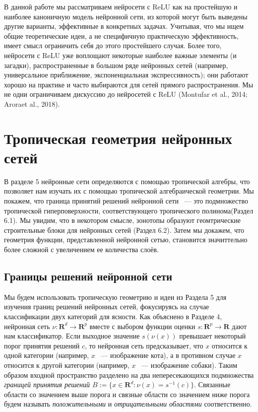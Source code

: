 \documentclass[russian]{lecture-notes}
\begin{document}
	В данной работе мы  рассматриваем нейросети с ReLU как на простейшую и наиболее каноничную модель нейронной сети,  из которой могут быть выведены другие варианты, эффективные в конкретных задачах. Учитывая, что мы ищем общие теоретические идеи, а не специфичную практическую эффективность, имеет смысл ограничить себя до этого простейшего случая. Более того, нейросети с ReLU уже воплощают некоторые наиболее важные элементы (и загадки), распространенные в большом ряде нейронных сетей (например, универсальное приближение, экспоненциальная экспрессивность); они работают хорошо на практике и часто выбираются для сетей прямого распространения. Мы не одни ограничиваем дискуссию до нейросетей с ReLU  (Montufar et al., 2014; Aroraet al., 2018).

	\section{Тропическая геометрия нейронных сетей}
	
	В разделе 5 нейронные сети определяются с помощью тропической алгебры, что позволяет нам изучать их с помощью тропической алгебраической геометрии. Мы покажем, что граница принятий решений нейронной сети ~--- это подмножество тропической гиперповерхности, соответствующего тропического полинома(Раздел 6.1). Мы увидим, что в некотором смысле, зонотопы образуют геомтрические строительные блоки для нейронных сетей (Раздел 6.2). Затем мы докажем, что геометрия функции, представленной нейронной сетью, становится значиттельно более сложной с увеличением ее количества слоёв.
	\subsection{Границы решений нейронной сети}
	
	Мы будем использовать тропическую геометрию и идеи из Раздела 5 для изучения границ решений нейронных сетей, фокусируясь на случае классификации двух категорий для ясности. Как объяснено в Разделе 4, нейронная сеть $\nu : \mathbf{R}^d \rightarrow \mathbf{R}^p$ вместе с выбором функции оценки $s: \mathbf{R}^p \rightarrow \mathbf{R}$ дают нам классификатор. Если выходное значение $s(\nu(x))$ превышает некоторый порог принятия решений $c$, то нейронная сеть предсказывает, что $x$ относится к одной категории (например, $x$ ~--- изображение кота), а в противном случае $x$ относится к другой категории (например, $x$ ~--- изображение собаки). Таким образом входной пространство разделено на два непересекающихся подмножества \textit{границей принятия решений $B := \{x \in \mathbf{R}^d : \nu(x) = s^{-1}(c)\} $}. Связанные области со значением выше порога и связные области со значением ниже порога будем называть \textit{положительными} и \textit{отрицательными областями} соответственно.
	
\end{document}
